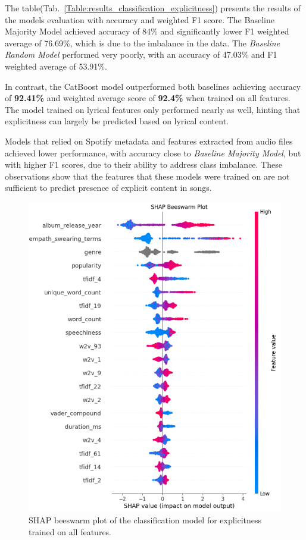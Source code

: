 The table(Tab.~\ref{Table:results_classification_explicitness}) presents the
results of the models evaluation with accuracy and weighted F1 score. The
Baseline Majority Model achieved accuracy of 84\% and significantly lower F1
weighted average of 76.69\%, which is due to the imbalance in the data. The
\textit{Baseline Random Model} performed very poorly, with an accuracy of
47.03\% and F1 weighted average of 53.91\%.

In contrast, the CatBoost model outperformed both baselines achieving accuracy
of \textbf{92.41\%} and weighted average score of \textbf{92.4\%} when trained
on all features. The model trained on lyrical features only performed nearly as
well, hinting that explicitness can largely be predicted based on lyrical
content. 

Models that relied on Spotify metadata and features extracted from
audio files achieved lower performance, with accuracy close to \textit{Baseline
Majority Model}, but with higher F1 scores, due to their ability to address
class imbalance. These observations show that the features that these models
were trained on are not sufficient to predict presence of explicit content
in songs.


\begin{center}
\begin{figure}[H]
  \centering
  \includegraphics[width=6in]{img/beeswarm_explicitness.png}
  \caption{SHAP beeswarm plot of the classification model for explicitness
  trained on all features.}
  \label{Figure:beeswarm_explicitness}
\end{figure}
\end{center}

